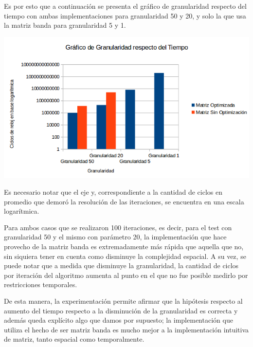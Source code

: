 	\par 
	Es por esto que a continuación se presenta el gráfico de granularidad respecto del tiempo con ambas implementaciones para granularidad 50 y 20, y solo la que usa la matriz banda para granularidad 5 y 1.
	\par 
	\begin{center}
		\includegraphics[scale=0.7]{./img/granularidad/granularidadrespectotiempo.png}
	\end{center}
	
	\par 
	Es necesario notar que el eje y, correspondiente a la cantidad de ciclos en promedio que demoró la resolución de las iteraciones, se encuentra en una escala logarítmica. 
	\par 
	Para ambos casos que se realizaron 100 iteraciones, es decir, para el test con granularidad 50 y el mismo con parámetro 20, la implementación que hace provecho de la matriz banda es extremadamente más rápida que aquella que no, sin siquiera tener en cuenta como disminuye la complejidad espacial. A su vez, se puede notar que a medida que disminuye la granularidad, la cantidad de ciclos por iteración del algoritmo aumenta al punto en el que no fue posible medirlo por restricciones temporales. 
	\par 
	De esta manera, la experimentación permite afirmar que la hipótesis respecto al aumento del tiempo respecto a la disminución de la granularidad es correcta y además queda explícito algo que damos por supuesto; la implementación que utiliza el hecho de ser matriz banda es mucho mejor a la implementación intuitiva de matriz, tanto espacial como temporalmente.
	
	\par 
	

